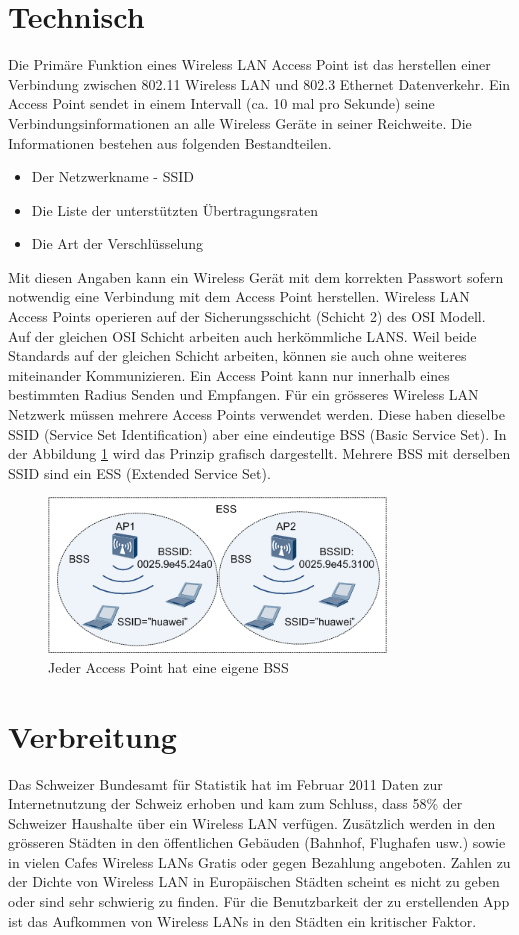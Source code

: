 \section{Technisch}
Die Primäre Funktion eines Wireless LAN Access Point ist das herstellen einer Verbindung zwischen 802.11 Wireless LAN und 802.3 Ethernet Datenverkehr. Ein Access Point sendet in einem Intervall (ca. 10 mal pro Sekunde) seine Verbindungsinformationen an alle Wireless Geräte in seiner Reichweite. Die Informationen bestehen aus folgenden Bestandteilen.
\begin{itemize}
\item Der Netzwerkname - SSID
\item Die Liste der unterstützten Übertragungsraten
\item Die Art der Verschlüsselung
\end{itemize}
Mit diesen Angaben kann ein Wireless Gerät mit dem korrekten Passwort sofern notwendig eine Verbindung mit dem Access Point herstellen. Wireless LAN Access Points operieren auf der Sicherungsschicht (Schicht 2) des OSI Modell. Auf der gleichen OSI Schicht arbeiten auch herkömmliche LANS. Weil beide Standards auf der gleichen Schicht arbeiten, können sie auch ohne weiteres miteinander Kommunizieren. \newline{}
Ein Access Point kann nur innerhalb eines bestimmten Radius Senden und Empfangen. Für ein grösseres Wireless LAN Netzwerk müssen mehrere Access Points verwendet werden. Diese haben dieselbe SSID (Service Set Identification) aber eine eindeutige BSS (Basic Service Set). In der Abbildung \ref{fig:bssap} wird das Prinzip grafisch dargestellt. Mehrere BSS mit derselben SSID sind ein ESS (Extended Service Set).
\begin{figure}[ht]
	\centering
	\includegraphics[width=0.8\textwidth]{images/ess.png}
	\caption{Jeder Access Point hat eine eigene BSS}
	\label{fig:bssap}
\end{figure}


\section{Verbreitung}
Das Schweizer Bundesamt für Statistik hat im Februar 2011 Daten zur Internetnutzung der Schweiz erhoben und kam zum Schluss, dass 58\% der Schweizer Haushalte über ein Wireless LAN verfügen\citep[S. 8]{bfs.internet.2011}. Zusätzlich werden in den grösseren Städten in den öffentlichen Gebäuden (Bahnhof, Flughafen usw.) sowie in vielen Cafes Wireless LANs Gratis oder gegen Bezahlung angeboten. Zahlen zu der Dichte von Wireless LAN in Europäischen Städten scheint es nicht zu geben oder sind sehr schwierig zu finden. Für die Benutzbarkeit der zu erstellenden App ist das Aufkommen von Wireless LANs in den Städten ein kritischer Faktor.

